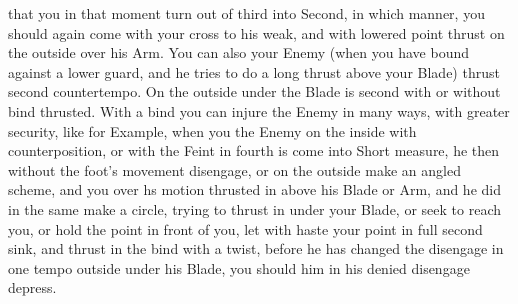 that you in that moment turn out of third into Second, in which
manner, you should again come with your cross to his weak, and with
lowered point thrust on the outside over his Arm.
You can also your Enemy (when you have bound against a lower guard,
and he tries to do a long thrust above your Blade) thrust second
countertempo. On the outside under the Blade is second with or without
bind thrusted. With a bind you can injure the Enemy in many ways, with
greater security, like for Example, when you the Enemy on the inside
with counterposition, or with the Feint in fourth is come into Short measure,
he then without the foot's movement disengage, or on the outside make
an angled scheme, and you over hs motion thrusted in above his Blade
or Arm, and he did in the same make a circle,
trying to thrust in under your Blade, or seek to reach you, or hold
the point in front of you, let with haste your point in full second
sink, and thrust in the bind with a twist, before he has changed the
disengage in one tempo outside under his Blade, you should him in his
denied disengage depress.

